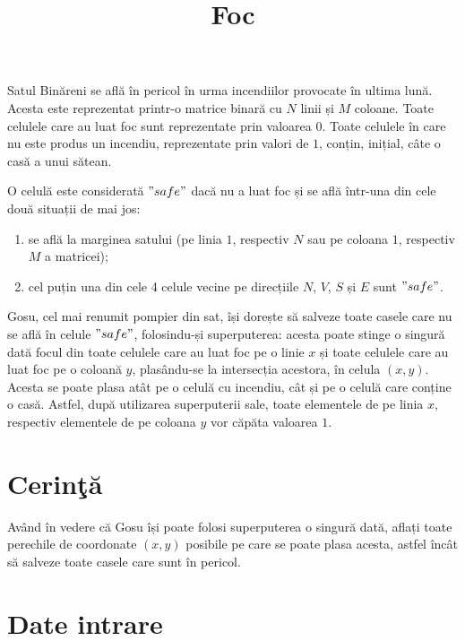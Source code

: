 \documentclass[ro]{problem}
\title{Foc}
\begin{document}
\maketitle

Satul Binăreni se află în pericol în urma incendiilor provocate în ultima lună. Acesta este reprezentat printr-o matrice binară cu $N$ linii și $M$ coloane. Toate celulele care au luat foc sunt reprezentate prin valoarea $0$. Toate celulele în care nu este produs un incendiu, reprezentate prin valori de $1$, conțin, inițial, câte o casă a unui sătean.

\par

O celulă este considerată $"safe"$ dacă nu a luat foc și se află într-una din cele două situații de mai jos:
\begin{enumerate}
    \item se află la marginea satului (pe linia $1$, respectiv $N$ sau pe coloana $1$, respectiv $M$ a matricei);
    \item cel puțin una din cele 4 celule vecine pe direcțiile $N$, $V$, $S$ și $E$ sunt $"safe"$.
\end{enumerate}

\par

Gosu, cel mai renumit pompier din sat, își dorește să salveze toate casele care nu se află în celule $"safe"$, folosindu-și superputerea: acesta poate stinge o singură dată focul din toate celulele care au luat foc pe o linie $x$ și toate celulele care au luat foc pe o coloană $y$, plasându-se la intersecția acestora, în celula $(x, y)$. Acesta se poate plasa atât pe o celulă cu incendiu, cât și pe o celulă care conține o casă. Astfel, după utilizarea superputerii sale, toate elementele de pe linia $x$, respectiv elementele de pe coloana $y$ vor căpăta valoarea $1$.

\section{Cerinţă}
Având în vedere că Gosu își poate folosi superputerea o singură dată, aflați toate perechile de coordonate $(x, y)$ posibile pe care se poate plasa acesta, astfel încât să salveze toate casele care sunt în pericol.
 
\section{Date intrare}
\end{document}
